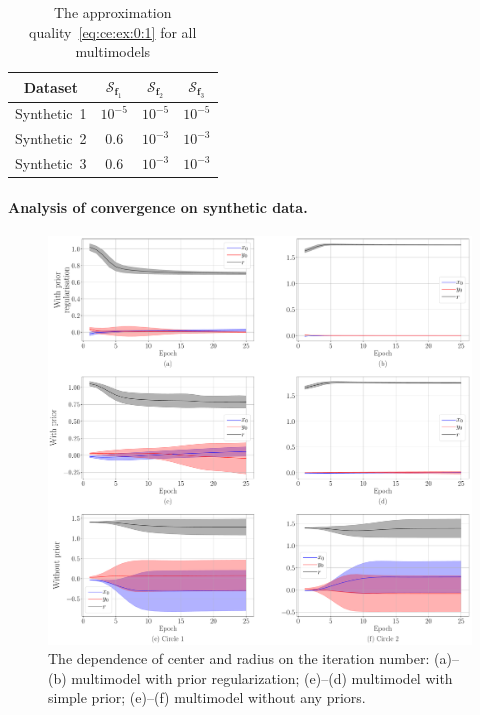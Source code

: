 \documentclass[12pt, twoside]{article}
\numberwithin{equation}{section}
\begin{document}
\begin{table}[h!t]
\begin{center}
\caption{The approximation quality~\eqref{eq:ce:ex:0:1} for all multimodels}
\label{tb:ce:1}
\begin{tabular}{|c|c|c|c|}
\hline
	Dataset & $\mathcal{S}_{\textbf{f}_1}$ & $\mathcal{S}_{\textbf{f}_2} $& $\mathcal{S}_{\textbf{f}_3} $\\
	\hline
	\multicolumn{1}{|l|}{Synthetic~1}
	& $10^{-5}$& $10^{-5}$& $10^{-5}$\\
	\hline
	\multicolumn{1}{|l|}{Synthetic~2}
	& $0.6$& $10^{-3}$& $10^{-3}$\\
	\hline
	\multicolumn{1}{|l|}{Synthetic~3}
	& $0.6$& $10^{-3}$& $10^{-3}$\\
\hline
\end{tabular}
\end{center}
\end{table}

\paragraph{Analysis of convergence on synthetic data.}
\begin{figure}[h!t]\center
\includegraphics[width=1\textwidth]{result_eng/experiment_synthetic_param_progress}
\caption{The dependence of center and radius on the iteration number: (a)--(b) multimodel with prior regularization; (e)--(d) multimodel with simple prior; (e)--(f) multimodel without any priors.}
\label{experiment:st:2:1}
\end{figure}
\end{document}
